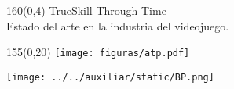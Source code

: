 \documentclass[shownotes,aspectratio=169]{beamer}
\begin{document}
\begin{frame}[plain]
\begin{textblock}{160}(0,4)
\centering \LARGE TrueSkill Through Time \\
\large Estado del arte en la industria del videojuego.
\end{textblock}


\begin{textblock}{155}(0,20) \centering
\texttt{[image: figuras/atp.pdf]}
\end{textblock}


\end{frame}



\begin{frame}
\centering \vspace{0.5cm}
\texttt{[image: ../../auxiliar/static/BP.png]}
\end{frame}





%
%
\end{document}

